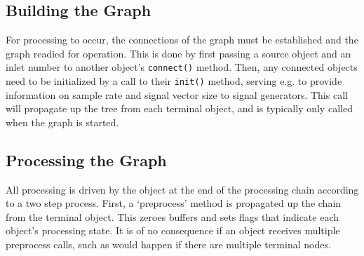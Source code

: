 \documentclass[twoside,a4paper]{article}
\begin{document}



\subsection{Building the Graph} %

For processing to occur, the connections of the graph must be established and the graph readied for operation.  This is done by first passing a source object and an inlet number to another object's \texttt{connect()} method.  Then, any connected objects need to be initialized by a call to their \texttt{init()} method, serving e.g. to provide information on sample rate and signal vector size to signal generators.  This call will propagate up the tree from each terminal object, and is typically only called when the graph is started.

%
% 
% 



\subsection{Processing the Graph} %

All processing is driven by the object at the end of the processing chain according to a two step process.  First, a `preprocess' method is propagated up the chain from the terminal object.  This zeroes buffers and sets flags that indicate each object's processing state.  It is of no consequence if an object receives multiple preprocess calls, such as would happen if there are multiple terminal nodes.
\end{document}
